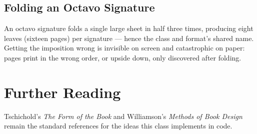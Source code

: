 \documentclass[demy,11pt,openright,titlepage]{octavo}
\begin{document}
\section{Folding an Octavo Signature}

An octavo signature folds a single large sheet in half three times,
producing eight leaves (sixteen pages) per signature — hence the class
and format's shared name. Getting the imposition wrong is invisible on
screen and catastrophic on paper: pages print in the wrong order, or
upside down, only discovered after folding.

\backmatter

\chapter{Further Reading}

Tschichold's \emph{The Form of the Book} and Williamson's \emph{Methods
of Book Design} remain the standard references for the ideas this
class implements in code.
\end{document}
